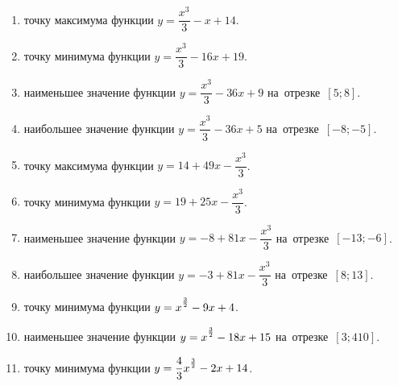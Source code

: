 \documentclass[a4paper,10pt]{article}
\begin{document}
\begin{enumerate}
\item {} точку максимума функции $y=\dfrac{x^3}{3} -x+14$.







\item {} точку минимума функции $y=\dfrac{x^3}{3} -16x+19$.







\item {} наименьшее значение функции $y=\dfrac{x^3}{3} -36x+9$ на~отрезке~$\left[5;8\right]$.

\item {} наибольшее значение функции $y=\dfrac{x^3}{3} -36x+5$ на~отрезке~$\left[-8;-5\right]$.

\item {} точку максимума функции $y=14 +49x-\dfrac{x^3}{3}$.







\item {} точку минимума функции $y=19 +25x-\dfrac{x^3}{3}$.







\item {} наименьшее значение функции $y=-8 +81x-\dfrac{x^3}{3}$ на~отрезке~$\left[-13;-6\right]$.

\item {} наибольшее значение функции $y=-3 +81x-\dfrac{x^3}{3}$ на~отрезке~$\left[8;13\right]$.

\item {} точку минимума функции $y=x\strut^{\frac{3}{2}} -9x+4$.







\item {} наименьшее значение функции $y=x\strut^{\frac{3}{2}} -18x+15$ на~отрезке~$\left[3;410\right]$.







\item {} точку минимума функции $y=\dfrac{4}{3}x\strut^{\frac{3}{2}} -2x+14$.


\end{enumerate}
\end{document}

